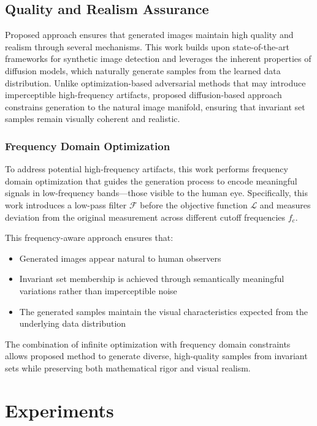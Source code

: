 \documentclass[licencjacka,en]{pracamgr}
\begin{document}
\section{Quality and Realism Assurance}\label{method:quality_realism}

Proposed approach ensures that generated images maintain high quality and realism through several mechanisms. This work builds upon state-of-the-art frameworks for synthetic image detection and leverages the inherent properties of diffusion models, which naturally generate samples from the learned data distribution. Unlike optimization-based adversarial methods that may introduce imperceptible high-frequency artifacts, proposed diffusion-based approach constrains generation to the natural image manifold, ensuring that invariant set samples remain visually coherent and realistic.

\subsection{Frequency Domain Optimization}

To address potential high-frequency artifacts, this work performs frequency domain optimization that guides the generation process to encode meaningful signals in low-frequency bands---those visible to the human eye. Specifically, this work introduces a low-pass filter $\mathcal{F}$ before the objective function $\mathcal{L}$ and measures deviation from the original measurement across different cutoff frequencies $f_c$.

This frequency-aware approach ensures that:
\begin{itemize}
  \item Generated images appear natural to human observers
  \item Invariant set membership is achieved through semantically meaningful variations rather than imperceptible noise
  \item The generated samples maintain the visual characteristics expected from the underlying data distribution
\end{itemize}

The combination of infinite optimization with frequency domain constraints allows proposed method to generate diverse, high-quality samples from invariant sets while preserving both mathematical rigor and visual realism.

\chapter{Experiments}\label{r:experiments}
\end{document}
